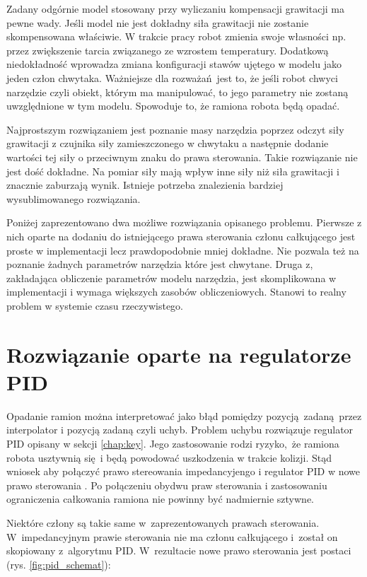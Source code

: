 Zadany odgórnie model stosowany przy wyliczaniu kompensacji grawitacji ma pewne wady. Jeśli model nie jest dokładny siła grawitacji nie zostanie skompensowana właściwie. W trakcie pracy robot zmienia swoje własności np. przez zwiększenie tarcia związanego ze wzrostem temperatury. Dodatkową niedokładność wprowadza zmiana konfiguracji stawów ujętego w modelu jako jeden człon chwytaka.  Ważniejsze dla rozważań jest to, że jeśli robot chwyci narzędzie czyli obiekt, którym ma manipulować, to jego parametry nie zostaną uwzględnione w tym modelu. Spowoduje to, że ramiona robota będą opadać.

Najprostszym rozwiązaniem jest poznanie masy narzędzia poprzez odczyt siły grawitacji z czujnika siły zamieszczonego w chwytaku a następnie dodanie wartości tej siły o przeciwnym znaku do prawa sterowania. Takie rozwiązanie nie jest dość dokładne. Na pomiar siły mają wpływ inne siły niż siła grawitacji i znacznie zaburzają wynik. Istnieje potrzeba znalezienia bardziej wysublimowanego rozwiązania.

Poniżej zaprezentowano dwa możliwe rozwiązania opisanego problemu. Pierwsze z nich oparte na dodaniu do istniejącego prawa sterowania członu całkującego jest proste w implementacji lecz prawdopodobnie mniej dokładne. Nie pozwala też na poznanie żadnych parametrów narzędzia które jest chwytane. Druga z, zakładająca obliczenie parametrów modelu narzędzia, jest skomplikowana w implementacji i wymaga większych zasobów obliczeniowych. Stanowi to realny problem w systemie czasu rzeczywistego.  

\section{Rozwiązanie oparte na regulatorze PID}
\label{chap:rozw_pid}
Opadanie ramion można interpretować jako błąd pomiędzy pozycją zadaną przez interpolator i pozycją zadaną czyli uchyb. Problem uchybu rozwiązuje regulator PID opisany w sekcji \ref{chap:key}. Jego zastosowanie rodzi ryzyko, że ramiona robota usztywnią się i będą powodować uszkodzenia w trakcie kolizji. Stąd wniosek aby połączyć prawo stereowania impedancyjengo i regulator PID w nowe prawo sterowania \cite{bib:gravity2, bib:rozw_pid1}. Po połączeniu obydwu praw sterowania i zastosowaniu ograniczenia całkowania ramiona nie powinny być nadmiernie sztywne. 

Niektóre człony są takie same w~zaprezentowanych prawach sterowania. W~impedancyjnym prawie sterowania nie ma członu całkującego i~został on skopiowany z~algorytmu PID. W~rezultacie nowe prawo sterowania jest postaci (rys. \ref{fig:pid_schemat}):

